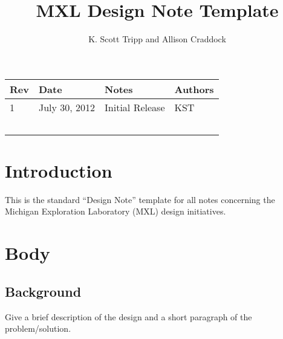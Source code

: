 \documentclass{mxl-design}
\title{MXL Design Note Template}
\author{K. Scott Tripp and Allison Craddock}
\begin{document}
\maketitle

\vspace{5in}
\begin{table}[H]
\begin{center}
\begin{tabular}{|p{0.5in}|p{1.2in}|p{2.8in}|p{0.5in}|}
	\hline
	\bf Rev & \bf Date & \bf Notes & \bf Authors \\ 
	\hline
	1	& July 30, 2012 & Initial Release 	& KST	\\ \hline
		&				&					&		\\ \hline
		&				&					&		\\ \hline
		&				&					&		\\ \hline
		&				&					&		\\ \hline
		&				&					&		\\ \hline
\end{tabular}
\end{center}
\end{table}

\clearpage
\tableofcontents
\clearpage


\section{Introduction}

This is the standard ``Design Note'' template for all notes concerning the Michigan Exploration Laboratory (MXL) design initiatives.

\section{Body}

\subsection{Background}
Give a brief description of the design and a short paragraph of the problem/solution.
\end{document}
